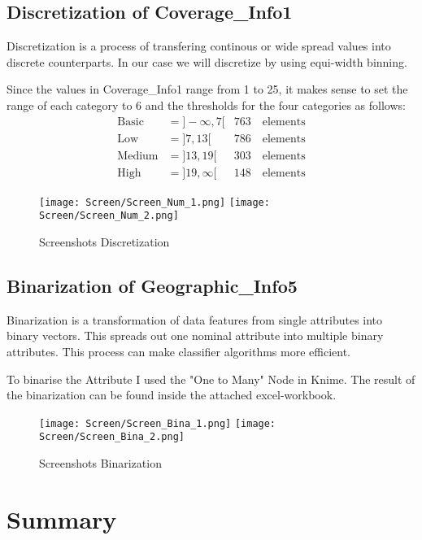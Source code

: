 \subsection{Discretization of Coverage\_Info1}
Discretization is a process of transfering continous or wide spread values into discrete counterparts. In our case we will discretize by using equi-width binning.
 
Since the values in Coverage\_Info1 range from 1 to 25, it makes sense to set the range of each category to $6$ and the thresholds for the four categories as follows:
\begin{align*}
\text{Basic} &= ]-\infty , 7[ & 763\quad\text{elements}\\
\text{Low} &= ]7 , 13[& 786\quad\text{elements}\\
\text{Medium} &= ]13 , 19[& 303\quad\text{elements}\\
\text{High} &= ]19 , \infty[& 148\quad\text{elements}
\end{align*}
\begin{figure}[H]
	\begin{center}
		\texttt{[image: Screen/Screen\_Num\_1.png]}
		\texttt{[image: Screen/Screen\_Num\_2.png]}	
	\end{center}
	\caption{Screenshots Discretization}
\end{figure}
\subsection{Binarization of Geographic\_Info5}
Binarization is a transformation of data features from single attributes into binary vectors. This spreads out one nominal attribute into multiple binary attributes. This process can make classifier algorithms more efficient.

To binarise the Attribute I used the "One to Many" Node in Knime. The result of the binarization can be found inside the attached excel-workbook.
\begin{figure}[H]
	\begin{center}
		\texttt{[image: Screen/Screen\_Bina\_1.png]}
		\texttt{[image: Screen/Screen\_Bina\_2.png]}
		
	\end{center}
	\caption{Screenshots Binarization}
\end{figure}
\pagebreak
\section{Summary}

